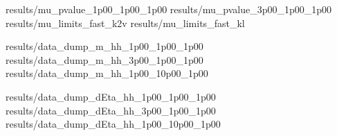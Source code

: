 {results/mu_pvalue_1p00_1p00_1p00}
{results/mu_pvalue_3p00_1p00_1p00}
{results/mu_limits_fast_k2v}
{results/mu_limits_fast_kl}

{results/data_dump_m_hh_1p00_1p00_1p00}
{results/data_dump_m_hh_3p00_1p00_1p00}
{results/data_dump_m_hh_1p00_10p00_1p00}

{results/data_dump_dEta_hh_1p00_1p00_1p00}
{results/data_dump_dEta_hh_3p00_1p00_1p00}
{results/data_dump_dEta_hh_1p00_10p00_1p00}


%
%
